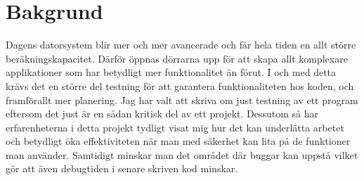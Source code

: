 \section{Bakgrund}	
	Dagens datorsystem blir mer och mer avancerade och får hela tiden en allt större beräkningskapacitet. Därför öppnas dörrarna upp för att skapa allt komplexare applikationer som har betydligt mer funktionalitet än förut. I och med detta krävs det en större del testning för att garantera funktionaliteten hos koden, och framförallt mer planering. \newline
	Jag har valt att skriva om just testning av ett program eftersom det just är en sådan kritisk del av ett projekt. Dessutom så har erfarenheterna i detta projekt tydligt visat mig hur det kan underlätta arbetet och betydligt öka effektiviteten när man med säkerhet kan lita på de funktioner man använder. Samtidigt minskar man det området där buggar kan uppstå vilket gör att även debugtiden i senare skriven kod minskar. \newline